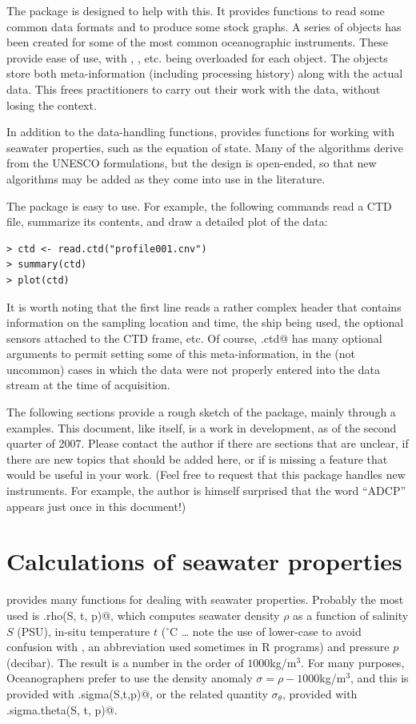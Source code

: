 \documentclass{article}
\begin{document}
The \verb@oce@ package is designed to help with this. It provides
functions to read some common data formats and to produce some stock
graphs. A series of objects has been created for some of the most
common oceanographic instruments. These provide ease of use, with
\verb@plot@, \verb@summary@, etc. being overloaded for each
object. The objects store both meta-information (including processing
history) along with the actual data.  This frees practitioners to
carry out their work with the data, without losing the context.

In addition to the data-handling functions, \verb@oce@ provides functions for working with
seawater properties, such as the equation of state. Many of the algorithms derive from the
UNESCO formulations, but the design is open-ended, so that new algorithms may be added as they
come into use in the literature.

The package is easy to use. For example, the
following commands read a CTD file, summarize its contents, and draw a detailed
plot of the data:
\begin{verbatim}
> ctd <- read.ctd("profile001.cnv")
> summary(ctd)
> plot(ctd)
\end{verbatim}

It is worth noting that the first line reads a rather complex header that contains information
on the sampling location and time, the ship being used, the optional sensors attached to the
CTD frame, etc. Of course, \verb@read.ctd@ has many optional arguments to permit setting some
of this meta-information, in the (not uncommon) cases in which the data were not properly
entered into the data stream at the time of acquisition.

The following sections provide a rough sketch of the \verb@oce@ package, mainly through a
examples. This document, like \verb@oce@ itself, is a work in development, as of the second
quarter of 2007. Please contact the author if there are sections that are unclear, if there are
new topics that should be added here, or if \verb@oce@ is missing a feature that would be
useful in your work. (Feel free to request that this package handles new instruments. For
example, the author is himself surprised that the word ``ADCP'' appears just once in this
document!)

\section{Calculations of seawater properties}

\verb@oce@ provides many functions for dealing with seawater properties. Probably the most
used is \verb@sw.rho(S, t, p)@, which computes seawater density $\rho$ as a function of
salinity $S$ (PSU), in-situ temperature $t$ ($^\circ$C \dots\/ note the use of lower-case to
avoid confusion with \verb@T@, an abbreviation used sometimes in R programs) and pressure $p$
(decibar). The result is a number in the order of $1000$kg/m$^3$. For many purposes,
Oceanographers prefer to use the density anomaly $\sigma=\rho-1000$kg/m$^3$, and this is
provided with \verb@sw.sigma(S,t,p)@, or the related quantity $\sigma_\theta$, provided with
\verb@sw.sigma.theta(S, t, p)@.
\end{document}
